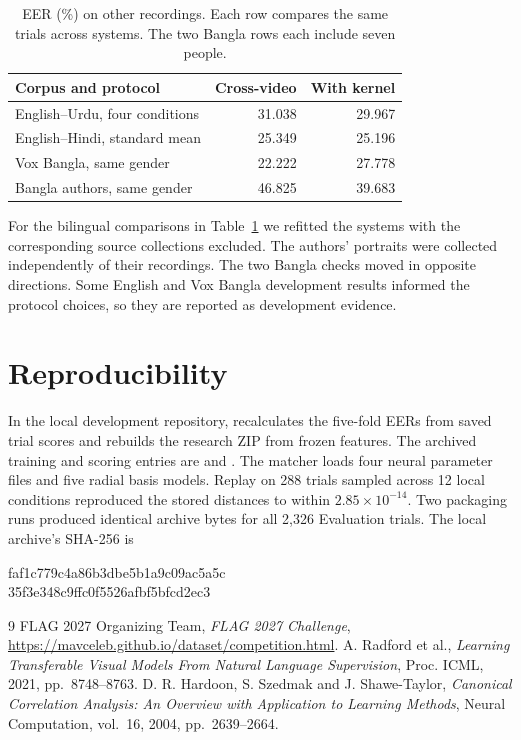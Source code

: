 \documentclass[10pt,letterpaper]{article}
\begin{document}
\begin{table}[!ht]
\centering
\caption{EER (\%) on other recordings. Each row compares the same
trials across systems. The two Bangla rows each include seven people.}
\label{tab:transfer}
\smallskip\small\renewcommand{\arraystretch}{1.15}
\begin{tabular}{@{}lrr@{}}
\hline
Corpus and protocol & Cross-video & With kernel\\ \hline
English--Urdu, four conditions &31.038&29.967\\
English--Hindi, standard mean &25.349&25.196\\
Vox Bangla, same gender &22.222&27.778\\
Bangla authors, same gender &46.825&39.683\\ \hline
\end{tabular}
\end{table}
For the bilingual comparisons in Table~\ref{tab:transfer} we refitted
the systems with the corresponding source collections excluded. The
authors' portraits were collected independently of their recordings. The
two Bangla checks moved in opposite directions. Some English and Vox
Bangla development results informed the protocol choices, so they are
reported as development evidence.

\section{Reproducibility}
In the local development repository,  recalculates the
five-fold EERs from saved trial scores and rebuilds the research ZIP
from frozen features. The archived training and scoring entries are
 and . The matcher loads
four neural parameter files and five radial basis models. Replay on 288 trials sampled across
12 local conditions reproduced the stored distances to within
\(2.85\times10^{-14}\). Two packaging runs produced identical archive
bytes for all 2,326 Evaluation trials. The local archive's SHA-256 is
\begin{center}\small\ttfamily
faf1c779c4a86b3dbe5b1a9c09ac5a5c\\
35f3e348c9ffc0f5526afbf5bfcd2ec3
\end{center}

\begin{thebibliography}{9}
 FLAG 2027 Organizing Team, \emph{FLAG 2027 Challenge},
\url{https://mavceleb.github.io/dataset/competition.html}.
 A. Radford et al., \emph{Learning Transferable Visual Models
From Natural Language Supervision}, Proc. ICML, 2021, pp.~8748--8763.
 D. R. Hardoon, S. Szedmak and J. Shawe-Taylor,
\emph{Canonical Correlation Analysis: An Overview with Application to
Learning Methods}, Neural Computation, vol.~16, 2004, pp.~2639--2664.
\end{thebibliography}
\end{document}
